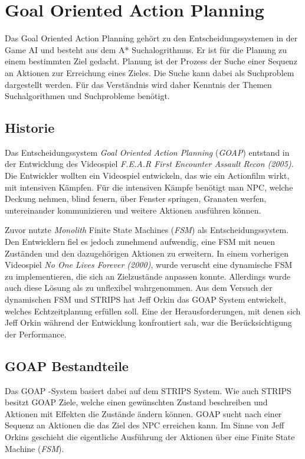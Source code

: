 \chapter{Goal Oriented Action Planning}

Das Goal Oriented Action Planning gehört zu den Entscheidungssystemen in der Game AI und besteht aus dem A* Suchalogrithmus. Er ist für die Planung zu einem bestimmten Ziel gedacht. Planung ist der Prozess der Suche einer Sequenz an Aktionen zur Erreichung eines Zieles. Die Suche kann dabei als Suchproblem dargestellt werden. Für das Verständnis wird daher Kenntnis der Themen Suchalgorithmen und Suchprobleme benötigt.



\section{Historie}

Das Entscheidungssystem \textit{Goal Oriented Action Planning} (\textit{GOAP}) entstand in der Entwicklung des Videospiel \textit{F.E.A.R First Encounter Assault Recon (2005)}. Die Entwickler wollten ein Videospiel entwickeln, das wie ein Actionfilm wirkt, mit intensiven Kämpfen. Für die intensiven Kämpfe benötigt man NPC, welche Deckung nehmen, blind feuern, über Fenster springen, Granaten werfen, untereinander kommunizieren und weitere Aktionen ausführen können.

Zuvor nutzte \textit{Monolith} Finite State Machines (\textit{FSM}) als Entscheidungssystem. Den Entwicklern fiel es jedoch zunehmend aufwendig, eine FSM mit neuen Zuständen und den dazugehörigen Aktionen zu erweitern. In einem vorherigen Videospiel \textit{No One Lives Forever (2000)}, wurde veruscht eine dynamische FSM zu implementieren, die sich an Zielzustände anpassen konnte. Allerdings wurde auch diese Lösung als zu unflexibel wahrgenommen. Aus dem Versuch der dynamischen FSM und STRIPS hat Jeff Orkin das GOAP System entwickelt, welches Echtzeitplanung erfüllen soll. Eine der Herausforderungen, mit denen sich Jeff Orkin während der Entwicklung konfrontiert sah, war die Berücksichtigung der Performance.\autocite{retro_fear}



\section{GOAP Bestandteile}

Das GOAP -System basiert dabei auf dem STRIPS System. Wie auch STRIPS besitzt GOAP Ziele, welche einen gewünschten Zustand beschreiben und Aktionen mit Effekten die Zustände ändern können. GOAP sucht nach einer Sequenz an Aktionen die das Ziel des NPC erreichen kann. Im Sinne von Jeff Orkins geschieht die eigentliche Ausführung der Aktionen über eine Finite State Machine (\textit{FSM}).


